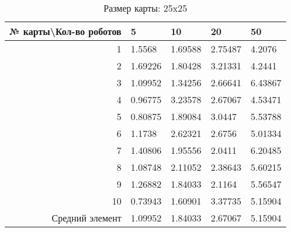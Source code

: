 \begin{table}[H]
\centering
\begin{tabular}{|r|l|l|l|l|}
\hline
№ карты\textbackslash Кол-во роботов & \textbf{5} & \textbf{10} & \textbf{20} & \textbf{50}\\ \hline
1 & 1.5568 & 1.69588 & 2.75487 & 4.2076\\ \hline
2 & 1.69226 & 1.80428 & 3.21331 & 4.2441\\ \hline
3 & 1.09952 & 1.34256 & 2.66641 & 6.43867\\ \hline
4 & 0.96775 & 3.23578 & 2.67067 & 4.53471\\ \hline
5 & 0.80875 & 1.89084 & 3.0447 & 5.53788\\ \hline
6 & 1.1738 & 2.62321 & 2.6756 & 5.01334\\ \hline
7 & 1.40806 & 1.95556 & 2.0411 & 6.20485\\ \hline
8 & 1.08748 & 2.11052 & 2.38643 & 5.60215\\ \hline
9 & 1.26882 & 1.84033 & 2.1164 & 5.56547\\ \hline
10 & 0.73943 & 1.60901 & 3.37735 & 5.15904\\ \hline
Средний элемент & 1.09952 & 1.84033 & 2.67067 & 5.15904\\ \hline
\end{tabular}
\caption*{Размер карты: 25x25}
\end{table}
